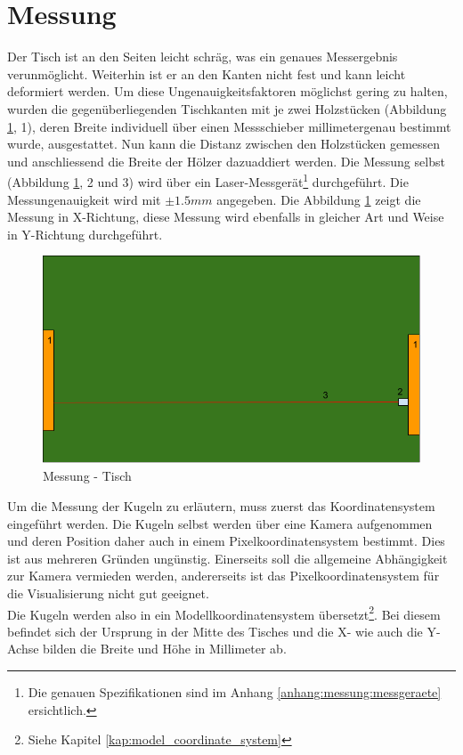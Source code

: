 \section{Messung}\label{kap:measurements}

Der Tisch ist an den Seiten leicht schräg, was ein genaues Messergebnis verunmöglicht. Weiterhin ist er an den Kanten
nicht fest und kann leicht deformiert werden. Um diese Ungenauigkeitsfaktoren möglichst gering zu halten, wurden die
gegenüberliegenden Tischkanten mit je zwei Holzstücken (Abbildung \ref{fig:messung:tisch}, 1), deren Breite individuell
über einen Messschieber millimetergenau bestimmt wurde, ausgestattet. Nun kann die Distanz zwischen den Holzstücken
gemessen und anschliessend die Breite der Hölzer dazuaddiert werden. Die Messung selbst (Abbildung \ref{fig:messung:tisch}, 2 und 3)
wird über ein Laser-Messgerät\footnote{Die genauen Spezifikationen sind im Anhang \ref{anhang:messung:messgeraete} ersichtlich.}
durchgeführt. Die Messungenauigkeit wird mit $\pm 1.5mm$ angegeben. Die Abbildung \ref{fig:messung:tisch} zeigt die Messung in X-Richtung,
diese Messung wird ebenfalls in gleicher Art und Weise in Y-Richtung durchgeführt.
\begin{figure}[h!]
    \begin{center}
        \includegraphics[width=0.6\linewidth]{../common/03_billiard_ai/resources/01_messung_tisch.png}
    \end{center}
    \caption{Messung - Tisch}
    \label{fig:messung:tisch}
\end{figure}


Um die Messung der Kugeln zu erläutern, muss zuerst das Koordinatensystem eingeführt werden. Die Kugeln selbst werden
über eine Kamera aufgenommen und deren Position daher auch in einem Pixelkoordinatensystem bestimmt. Dies ist aus
mehreren Gründen ungünstig. Einerseits soll die allgemeine Abhängigkeit zur Kamera vermieden werden, andererseits ist das
Pixelkoordinatensystem für die Visualisierung nicht gut geeignet.\\
Die Kugeln werden also in ein Modellkoordinatensystem übersetzt\footnote{Siehe Kapitel \ref{kap:model_coordinate_system}}.
Bei diesem befindet sich der Ursprung in der Mitte des Tisches und die X- wie auch die Y-Achse bilden die Breite und Höhe
in Millimeter ab.

